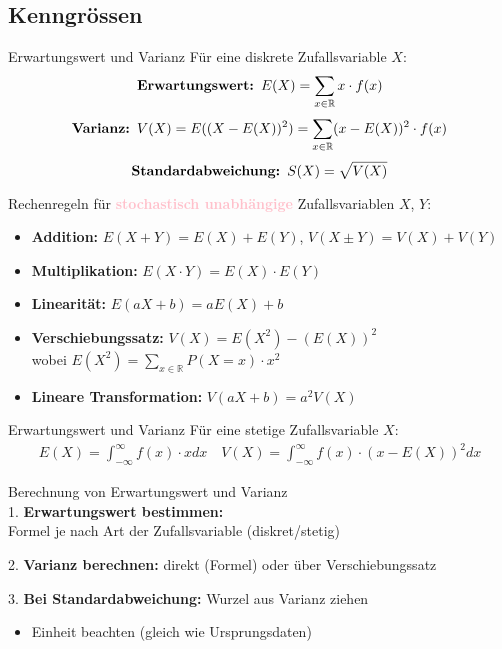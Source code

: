 \subsection{Kenngrössen}

\begin{definition}{Erwartungswert und Varianz}
Für eine diskrete Zufallsvariable $X$:
\vspace{-2mm}\\
$$\text{\textbf{Erwartungswert: }} E(X) = \sum_{x \in \mathbb{R}} x \cdot f(x)$$
$$\text{\textbf{Varianz: }}V(X) = E((X-E(X))^2) = \sum_{x \in \mathbb{R}} (x-E(X))^2 \cdot f(x)$$
$$\text{\textbf{Standardabweichung: }}S(X) = \sqrt{V(X)}$$
\end{definition}

\begin{theorem}{Rechenregeln} für \textcolor{pink}{\textbf{stochastisch unabhängige}} Zufallsvariablen $X$, $Y$:
    \vspace{1mm}
\begin{itemize}
    \setlength{\itemsep}{2pt}
    \item \textbf{Addition:} $E(X + Y) = E(X) + E(Y)$, $V(X \pm Y) = V(X) + V(Y)$
    \item \textbf{Multiplikation:} $E(X \cdot Y) = E(X) \cdot E(Y)$
    \item \textbf{Linearität:} $E(aX + b) = aE(X) + b$
    \item \textbf{Verschiebungssatz:} $V(X) = E(X^2) - (E(X))^2$\\
    wobei $E(X^2) = \sum_{x\in\mathbb{R}} P(X = x) \cdot x^2$
    \item \textbf{Lineare Transformation:} $V(aX + b) = a^2V(X)$
\end{itemize}
\end{theorem}

\begin{corollary}{Erwartungswert und Varianz}    
Für eine stetige Zufallsvariable $X$:
$$
\begin{gathered}
E(X)=\int_{-\infty}^{\infty} f(x) \cdot x dx \quad
V(X)=\int_{-\infty}^{\infty} f(x) \cdot(x-E(X))^2 dx
\end{gathered}
$$
\end{corollary}

\begin{KR}{Berechnung von Erwartungswert und Varianz}\\
1. \textbf{Erwartungswert bestimmen:} \\Formel je nach Art der Zufallsvariable (diskret/stetig)

2. \textbf{Varianz berechnen:} direkt (Formel) oder über Verschiebungssatz

3. \textbf{Bei Standardabweichung:} Wurzel aus Varianz ziehen
   \begin{itemize}
   \item Einheit beachten (gleich wie Ursprungsdaten)
   \end{itemize}
\end{KR}

